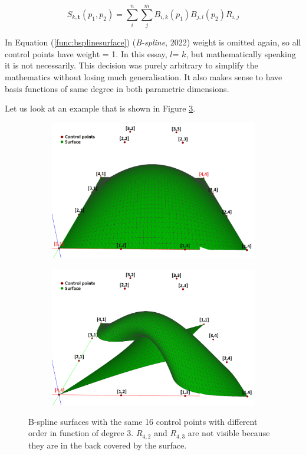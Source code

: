 \documentclass{article}
\begin{document}
\begin{equation}
S_{k,\mathbf{t}}(p_1, p_2) = \sum_{i}^n\sum_{j}^m B_{i,k}(p_1)B_{j,l}(p_2) R_{i,j}
\label{func:bsplinesurface}
\end{equation}

In Equation (\ref{func:bsplinesurface}) (\emph{B-spline}, 2022) weight is omitted again, so all control points have weight = 1. In this essay, $l$= $k$, but mathematically speaking it is not necessarily. This decision was purely arbitrary to simplify the mathematics without losing much generalisation. It also makes sense to have basis functions of same degree in both parametric dimensions.

Let us look at an example that is shown in Figure \ref{bsplinesurfacecomparsion}.

\begin{figure}[H]
\centering
\begin{subfigure}[b]{0.48\textwidth}
\includegraphics[width=\textwidth]{bsplinesurface1}
\caption{}
\label{bsplinesurface2}
\end{subfigure}
\begin{subfigure}[b]{0.48\textwidth}
\includegraphics[width=\textwidth]{bsplinesurface2}
\caption{}
\label{bsplinesurface2}
\end{subfigure}
\caption{B-spline surfaces with the same 16 control points with different order in function of degree 3. $R_{4,2}$ and $R_{4,3}$ are not visible because they are in the back covered by the surface.}
\label{bsplinesurfacecomparsion}
\end{figure}
\end{document}
